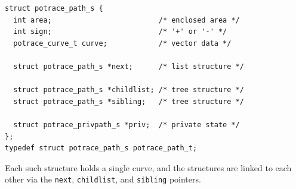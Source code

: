 \documentclass{article}
\begin{document}
\begin{verbatim}
struct potrace_path_s {
  int area;                         /* enclosed area */
  int sign;                         /* '+' or '-' */
  potrace_curve_t curve;            /* vector data */

  struct potrace_path_s *next;      /* list structure */

  struct potrace_path_s *childlist; /* tree structure */
  struct potrace_path_s *sibling;   /* tree structure */

  struct potrace_privpath_s *priv;  /* private state */
};
typedef struct potrace_path_s potrace_path_t;
\end{verbatim}

Each such structure holds a single curve, and the structures are
linked to each other via the \verb!next!, \verb!childlist!, and
\verb!sibling! pointers.
\end{document}
